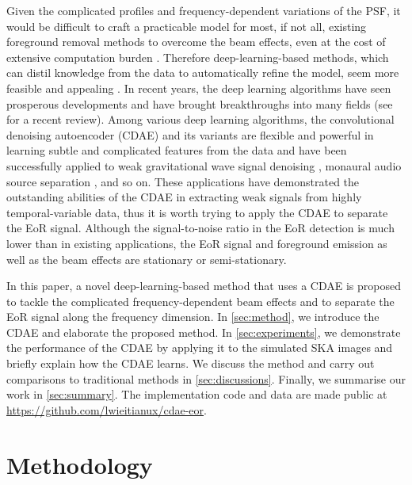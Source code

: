 \documentclass[fleqn,usenatbib]{mnras}
\newcommand{\editwip}[1]{{\leavevmode\color{magenta}#1}}
\begin{document}
Given the complicated profiles and frequency-dependent variations of
the PSF, it would be difficult to craft a practicable model for most,
if not all, existing foreground removal methods to overcome the beam
effects, even at the cost of extensive computation burden
\citep[e.g.,][]{lochner2015}.
Therefore deep-learning-based methods, which can distil knowledge from
the data to automatically refine the model, seem more feasible
and appealing \citep[e.g.,][]{herbel2018,vafaeiSadr2018}.
In recent years, the deep learning algorithms have seen prosperous
developments and have brought breakthroughs into many fields
(see \citealt{lecun2015} for a recent review).
Among various deep learning algorithms, the convolutional denoising
autoencoder (CDAE) and its variants are flexible and powerful in
learning subtle and complicated features from the data and have been
successfully applied to
weak gravitational wave signal denoising \citep[e.g.,][]{shen2017},
monaural audio source separation \citep[e.g.,][]{grais2017}, and so on.
These applications have demonstrated the outstanding abilities of the
CDAE in extracting weak signals from highly temporal-variable data,
thus it is worth trying to apply the CDAE to separate the EoR signal.
Although the signal-to-noise ratio in the EoR detection is much lower
than in existing applications, the EoR signal and foreground emission
as well as the beam effects are stationary or semi-stationary.

In this paper, a novel deep-learning-based method that uses a CDAE
is proposed to tackle the complicated frequency-dependent beam effects
and to separate the EoR signal along the frequency dimension.
In \autoref{sec:method}, we introduce the CDAE and elaborate
the proposed method.
In \autoref{sec:experiments}, we demonstrate the performance of the
CDAE by applying it to the simulated SKA images
\editwip{and briefly explain how the CDAE learns}.
We discuss the method and carry out
\editwip{comparisons to traditional methods}
in \autoref{sec:discussions}.
Finally, we summarise our work in \autoref{sec:summary}.
The implementation code and data are made public at
\url{https://github.com/lwieitianux/cdae-eor}.


\section{Methodology}
\label{sec:method}

\end{document}
